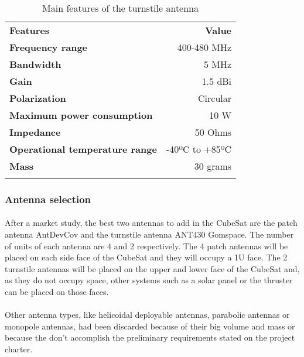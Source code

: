 \begin{longtable}{| l | r |}

\hline
\rowcolor[gray]{0.60} \multicolumn{2}{|c|}{\textbf{Turnstile antenna ANT430}} \\
\hline

\hline
\rowcolor[gray]{0.75}	\textbf{Features} &  \textbf{Value}   \\
\hline

\cellcolor[gray]{0.85} \textbf{Frequency range} & 400-480 MHz  \\
\cellcolor[gray]{0.85} \textbf{Bandwidth} & 5 MHz \\
\cellcolor[gray]{0.85} \textbf{Gain} & 1.5 dBi \\
\cellcolor[gray]{0.85} \textbf{Polarization} & Circular \\
\cellcolor[gray]{0.85} \textbf{Maximum power consumption} & 10 W \\
\cellcolor[gray]{0.85} \textbf{Impedance} & 50 Ohms \\
\cellcolor[gray]{0.85} \textbf{Operational temperature range} & -40ºC to +85ºC \\
\cellcolor[gray]{0.85} \textbf{Mass} & 30 grams \\
\hline

\caption{Main features of the turnstile antenna}
\label{turnstileantenna}

\end{longtable}

\subsubsection{Antenna selection}
\paragraph{}After a market study, the best two antennas to add in the CubeSat are the patch antenna AntDevCov and the turnstile antenna ANT430 Gomspace. The number of units of each antenna are 4 and 2 respectively. The 4 patch antennas will be placed on each side face of the CubeSat and they will occupy a 1U face. The 2 turnstile antennas will be placed on the upper and lower face of the CubeSat and, as they do not occupy space, other systems such as  a solar panel or the thruster can be placed on those faces.

\paragraph{} Other antenna types, like helicoidal deployable antennas, parabolic antennas or monopole antennas, had been discarded because of their big volume and mass or because the don't accomplish the preliminary requirements stated on the project charter.  
